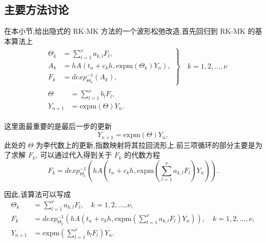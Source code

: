 
\subsection{主要方法讨论}

在本小节,给出隐式的 RK-MK 方法的一个波形松弛改造,首先回归到 RK-MK 的基本算法上
\begin{equation*}
	\begin{aligned}
		&\left.\begin{aligned}
		\Theta_k&=\sum_{l=1}^{\nu}a_{k,l}F_l,\\
		A_k&=hA(t_n+c_kh,\mbox{expm}(\Theta_k)Y_n),\\
		F_k&=dexp_{\Theta_k}^{-1}(A_k),
	\end{aligned}\right\rbrace \quad k=1,2,\ldots,\nu\\
		&\begin{aligned}
		\Theta&=\sum_{l=1}^{\nu}b_lF_l,\\
		Y_{n+1}&=\mbox{expm}(\Theta)Y_n.
	\end{aligned}
	\end{aligned}
\end{equation*}

这里面最重要的是最后一步的更新
\begin{equation*}
	Y_{n+1}=\mbox{expm}(\Theta)Y_n,
\end{equation*}
此处的 $\Theta$ 为李代数上的更新,指数映射将其拉回流形上.前三项循环的部分主要是为了求解 $F_k$, 可以通过代入得到关于 $F_k$ 的代数方程
\begin{equation*}
	F_k=dexp_{\Theta_k}^{-1}(hA(t_n+c_kh,\mbox{expm}(\sum_{l=1}^{\nu}a_{k,l}F_l)Y_n)).
\end{equation*}

因此,该算法可以写成
\begin{equation*}
	\begin{aligned}
		\Theta_k&=\sum_{l=1}^{\nu}a_{k,l}F_l,\quad k=1,2,\ldots,\nu,\\
		F_k&=dexp_{\Theta_k}^{-1}(hA(t_n+c_kh,\mbox{expm}(\sum_{l=1}^{\nu}a_{k,l}F_l)Y_n)),\quad k=1,2,\ldots,\nu,\\
		Y_{n+1}&=\mbox{expm}(\sum_{l=1}^{\nu}b_lF_l)Y_n.
	\end{aligned}
\end{equation*}

